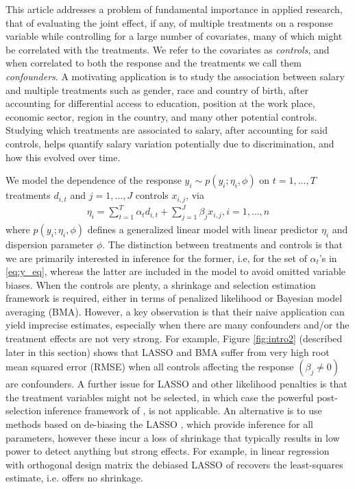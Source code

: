 \documentclass[12pt]{article}
\begin{document}
This article addresses a problem of fundamental importance in applied research, that of evaluating the joint effect, if any, of multiple treatments on a response variable while controlling for a large number of covariates, many of which might be correlated with the treatments. We refer to the covariates as \textit{controls}, and when correlated to both the response and the treatments we call them \textit{confounders}.
A motivating application is to study the association between salary and multiple treatments such as gender, race and country of birth, after accounting for differential access to education, position at the work place, economic sector, region in the country, and many other potential controls. Studying which treatments are associated to salary, after accounting for said controls, helps quantify salary variation potentially due to discrimination, and how this evolved over time.

We model the dependence of the response $y_{i} \sim p(y_{i}; \eta_{i}, \phi)$ on $t=1,\ldots,T$ treatments $d_{i,t}$ and $j=1,\ldots,J$ controls $x_{i,j}$, via 
\begin{align}
\eta_{i} = \sum_{t=1}^{T} \alpha_{t} d_{i,t} + \sum_{j=1}^{J} \beta_{j} x_{i,j}, i=1,\ldots, n \label{eq:y_eq}
\end{align}
where $p(y_i; \eta_i, \phi)$ defines a generalized linear model with linear predictor $\eta_i$ and dispersion parameter $\phi$.
The distinction between treatments and controls is that we are primarily interested in inference for the former, i.e, for the set of $\alpha_t$'s in \eqref{eq:y_eq}, whereas the latter are included in the model to avoid omitted variable biases. When the controls are plenty, a shrinkage and selection estimation framework is required, either in terms of penalized likelihood or Bayesian model averaging (BMA). 
However, a key observation is that their naive application can yield imprecise estimates, especially when there are many confounders and/or the treatment effects are not very strong.
For example, Figure \ref{fig:intro2} (described later in this section) shows that LASSO and BMA suffer from very high root mean squared error (RMSE) when all controls affecting the response $(\beta_j \neq 0)$ are confounders.
A further issue for LASSO and other likelihood penalties is that the treatment variables might not be selected, in which case the powerful post-selection inference framework of \cite{lee_jason:2016}, %
is not applicable.
An alternative is to use methods based on de-biasing the LASSO \citep{vdgeer14, javanmard14}, which provide inference for all parameters, however these incur a loss of shrinkage that typically results in low power to detect anything but strong effects.
For example, in linear regression with orthogonal design matrix the debiased LASSO of \cite{vdgeer14} recovers the least-squares estimate, i.e. offers no shrinkage.
\end{document}
